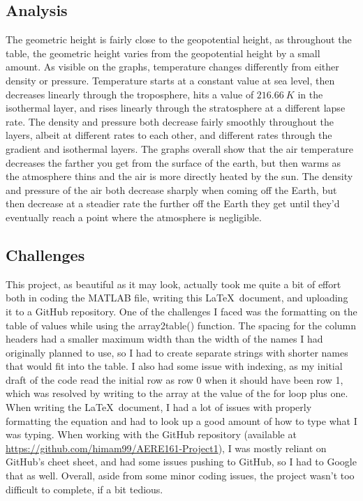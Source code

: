 \documentclass{article}
\begin{document}
\subsection{Analysis}
The geometric height is fairly close to the geopotential height, as throughout the table, the geometric height varies from the geopotential height by a small amount. As visible on the graphs, temperature changes differently from either density or pressure. Temperature starts at a constant value at sea level, then decreases linearly through the troposphere, hits a value of $216.66\ K$ in the isothermal layer, and rises linearly through the stratosphere at a different lapse rate. The density and pressure both decrease fairly smoothly throughout the layers, albeit at different rates to each other, and different rates through the gradient and isothermal layers. The graphs overall show that the air temperature decreases the farther you get from the surface of the earth, but then warms as the atmosphere thins and the air is more directly heated by the sun. The density and pressure of the air both decrease sharply when coming off the Earth, but then decrease at a steadier rate the further off the Earth they get until they'd eventually reach a point where the atmosphere is negligible.

\subsection{Challenges}
This project, as beautiful as it may look, actually took me quite a bit of effort both in coding the MATLAB file, writing this \LaTeX\ document, and uploading it to a GitHub repository. One of the challenges I faced was the formatting on the table of values while using the array2table() function. The spacing for the column headers had a smaller maximum width than the width of the names I had originally planned to use, so I had to create separate strings with shorter names that would fit into the table. I also had some issue with indexing, as my initial draft of the code read the initial row as row 0 when it should have been row 1, which was resolved by writing to the array at the value of the for loop plus one. When writing the \LaTeX\ document, I had a lot of issues with properly formatting the equation and had to look up a good amount of how to type what I was typing. When working with the GitHub repository (available at \url{https://github.com/himam99/AERE161-Project1}), I was mostly reliant on GitHub's cheet sheet, and had some issues pushing to GitHub, so I had to Google that as well. Overall, aside from some minor coding issues, the project wasn't too difficult to complete, if a bit tedious. 
\end{document}

